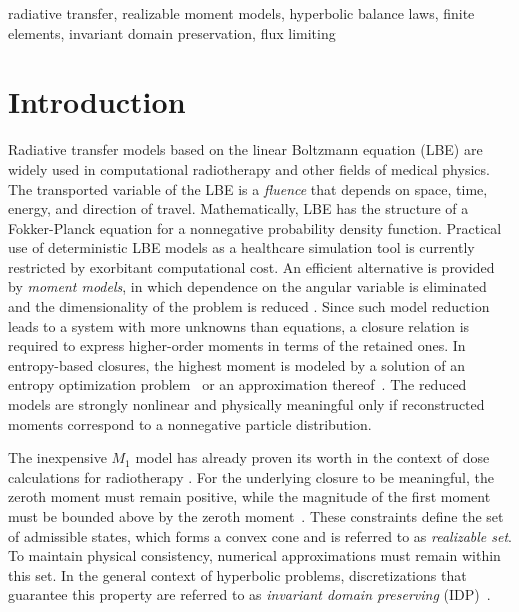 \documentclass[preprint, 11pt]{elsarticle}
\begin{document}
\begin{frontmatter}
\begin{keyword}
  radiative transfer, realizable moment models,
  hyperbolic balance laws, finite elements,
  invariant domain preservation, flux limiting
\end{keyword}

\end{frontmatter}

\section{Introduction}
\label{sec:intro}

Radiative transfer models based on the linear Boltzmann equation (LBE) are widely used in computational radiotherapy  \cite{bedford2019,gifford2006,vassiliev2010}
and other fields of medical physics. The transported variable of the LBE is a \emph{fluence} that depends on space, time, energy, and direction of travel. Mathematically, LBE has the structure of a Fokker-Planck equation for a nonnegative probability density function. Practical use of deterministic LBE models as a healthcare simulation tool is currently restricted by exorbitant computational cost. An efficient alternative is provided by \emph{moment models}, in which dependence on the angular variable is eliminated and the dimensionality of the problem is reduced \cite{schneider2020,schneider2022}. Since such model reduction leads to a system with more unknowns than equations, a closure relation is required to express higher-order moments in terms of the retained ones. In entropy-based closures, the highest moment is modeled by a solution of an entropy optimization problem~\cite{alldredge2012, brunner2000, brunner2001, coulombel2006, frank2012, hauck2011, levermore1996} or an approximation thereof~\cite{chidyagwai2018, levermore1984, minerbo1978, monreal2013, pichard2017}. The reduced models are
strongly nonlinear and physically meaningful only if reconstructed moments correspond to a nonnegative particle distribution.

The inexpensive $M_1$ model \cite{chu2019,monreal2013} has already proven its worth in the context of dose calculations for radiotherapy \cite{barnard2012,birindelli2019,duclous2010,frank2007,pichard2016}. For the underlying closure to be meaningful, the zeroth moment must remain positive, while the magnitude of the first moment must be bounded above by the zeroth moment~\cite{berthon2007, chu2019, kershaw1976,olbrant2012}.
These constraints define the set of admissible states, which forms a convex cone and is referred to as \textit{realizable set}.
To maintain physical consistency, numerical approximations must remain within this set. In the general context of  hyperbolic problems,
discretizations that guarantee this property are referred to as \textit{invariant domain preserving} (IDP)~\cite{guermond2016,kuzmin2023}.
\end{document}
